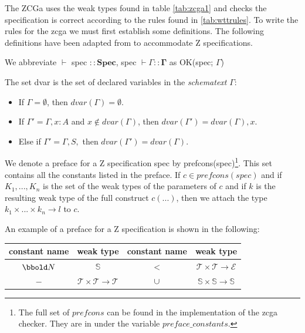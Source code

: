 The ZCGa uses the weak types found in table \ref{tab:zcga1} and checks the
specification is correct according to the rules found in \ref{tab:wttrules}. To
write the rules for the \gls{zcga} we must first establish some definitions. The
following definitions have been adapted from \cite{wtt} to accommodate Z
specifications.

\begin{defin}
We abbreviate $\vdash$ spec $\mathbf{::Spec}$, spec $\vdash \Gamma
\mathbf{::\Gamma}$ as OK(spec; $\Gamma$)
\end{defin}

\begin{defin} The set dvar is the set of declared variables in the
\emph{schematext} $\Gamma$:
\begin{itemize}
\item If $\Gamma = \emptyset$, then $dvar(\Gamma) = \emptyset$.
\item If $\Gamma' = \Gamma, x:A$ and $x \notin dvar(\Gamma)$, then
$dvar(\Gamma') = dvar(\Gamma), x$.
\item Else if $\Gamma' =\Gamma,S,$ then $dvar(\Gamma') = dvar(\Gamma)$.
\end{itemize}
\end{defin}

\begin{defin} We denote a preface for a Z specification spec by 
prefcons(spec)\footnote{The full set of $prefcons$ can be found in the implementation of the
\gls{zcga} checker. They are in under the variable $preface\_constants$.}. This
set contains all the constants listed in the preface. If $c \in prefcons(spec)$
and if $K_{1},...,K_{n}$ is the set of the weak types of the parameters of $c$
and if $k$ is the resulting weak type of the full construct $c(...)$, then we
attach the type $k_{1} \times ... \times k_{n} \rightarrow l$ to $c$.
\end{defin}

\begin{exam}

\end{exam} An example of a preface for a Z specification is shown in the
following:

\begin{tabular}{| c | c || c | c |}
\hline
constant name & weak type & constant name & weak type \\
\hline
$\nat$ & $\mathbb{S}$ & $<$ & $\mathcal{T} \times \mathcal{T} \rightarrow
\mathcal{E}$ \\
$-$ & $\mathcal{T} \times \mathcal{T} \rightarrow \mathcal{T}$ & $\cup$ &
$\mathbb{S} \times \mathbb{S} \rightarrow \mathbb{S} $ \\
\hline
\end{tabular}

